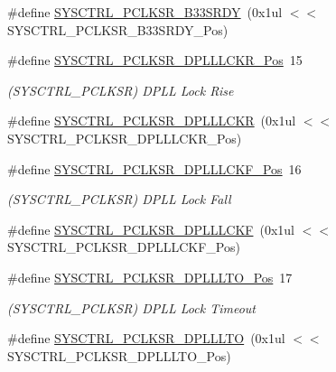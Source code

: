 \begin{DoxyCompactItemize}
\#define \mbox{\hyperlink{group___s_a_m_d21___s_y_s_c_t_r_l_ga59c209fb9d53be03c8549bb6a383c92f}{S\+Y\+S\+C\+T\+R\+L\+\_\+\+P\+C\+L\+K\+S\+R\+\_\+\+B33\+S\+R\+DY}}~(0x1ul $<$$<$ S\+Y\+S\+C\+T\+R\+L\+\_\+\+P\+C\+L\+K\+S\+R\+\_\+\+B33\+S\+R\+D\+Y\+\_\+\+Pos)
\item 
\#define \mbox{\hyperlink{group___s_a_m_d21___s_y_s_c_t_r_l_ga8e6a57c2a45f4bef2d4932794a61a64c}{S\+Y\+S\+C\+T\+R\+L\+\_\+\+P\+C\+L\+K\+S\+R\+\_\+\+D\+P\+L\+L\+L\+C\+K\+R\+\_\+\+Pos}}~15
\begin{DoxyCompactList}\small\item\em (S\+Y\+S\+C\+T\+R\+L\+\_\+\+P\+C\+L\+K\+SR) D\+P\+LL Lock Rise \end{DoxyCompactList}\item 
\#define \mbox{\hyperlink{group___s_a_m_d21___s_y_s_c_t_r_l_ga7ebbfa40f21e5fd74ad901ef107aff38}{S\+Y\+S\+C\+T\+R\+L\+\_\+\+P\+C\+L\+K\+S\+R\+\_\+\+D\+P\+L\+L\+L\+C\+KR}}~(0x1ul $<$$<$ S\+Y\+S\+C\+T\+R\+L\+\_\+\+P\+C\+L\+K\+S\+R\+\_\+\+D\+P\+L\+L\+L\+C\+K\+R\+\_\+\+Pos)
\item 
\#define \mbox{\hyperlink{group___s_a_m_d21___s_y_s_c_t_r_l_gad5518c8a4d179f6e1a29f9b13fba4d76}{S\+Y\+S\+C\+T\+R\+L\+\_\+\+P\+C\+L\+K\+S\+R\+\_\+\+D\+P\+L\+L\+L\+C\+K\+F\+\_\+\+Pos}}~16
\begin{DoxyCompactList}\small\item\em (S\+Y\+S\+C\+T\+R\+L\+\_\+\+P\+C\+L\+K\+SR) D\+P\+LL Lock Fall \end{DoxyCompactList}\item 
\#define \mbox{\hyperlink{group___s_a_m_d21___s_y_s_c_t_r_l_ga77342a2996f71ccc049469c184588030}{S\+Y\+S\+C\+T\+R\+L\+\_\+\+P\+C\+L\+K\+S\+R\+\_\+\+D\+P\+L\+L\+L\+C\+KF}}~(0x1ul $<$$<$ S\+Y\+S\+C\+T\+R\+L\+\_\+\+P\+C\+L\+K\+S\+R\+\_\+\+D\+P\+L\+L\+L\+C\+K\+F\+\_\+\+Pos)
\item 
\#define \mbox{\hyperlink{group___s_a_m_d21___s_y_s_c_t_r_l_gaad9f790a0e9d321448cfc61e29026352}{S\+Y\+S\+C\+T\+R\+L\+\_\+\+P\+C\+L\+K\+S\+R\+\_\+\+D\+P\+L\+L\+L\+T\+O\+\_\+\+Pos}}~17
\begin{DoxyCompactList}\small\item\em (S\+Y\+S\+C\+T\+R\+L\+\_\+\+P\+C\+L\+K\+SR) D\+P\+LL Lock Timeout \end{DoxyCompactList}\item 
\#define \mbox{\hyperlink{group___s_a_m_d21___s_y_s_c_t_r_l_ga7a09b13fc858e5d6c534a28020c73788}{S\+Y\+S\+C\+T\+R\+L\+\_\+\+P\+C\+L\+K\+S\+R\+\_\+\+D\+P\+L\+L\+L\+TO}}~(0x1ul $<$$<$ S\+Y\+S\+C\+T\+R\+L\+\_\+\+P\+C\+L\+K\+S\+R\+\_\+\+D\+P\+L\+L\+L\+T\+O\+\_\+\+Pos)

\end{DoxyCompactItemize}
